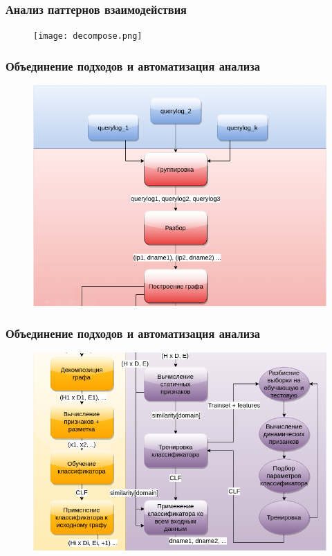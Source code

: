 \documentclass[12pt,pdf,hyperref={unicode}]{beamer}
\begin{document}
\begin{frame}
\frametitle{Анализ паттернов взаимодействия}
\begin{figure}[H]
	\centering
	\texttt{[image: decompose.png]}
\end{figure}
\end{frame}

\begin{frame}
\frametitle{Объединение подходов и автоматизация анализа}
\begin{figure}[H]
	\centering
	\includegraphics[scale=0.37]{schema-head.png}
\end{figure}
\end{frame}

\begin{frame}
\frametitle{Объединение подходов и автоматизация анализа}
\begin{figure}[H]
	\centering
	\includegraphics[scale=0.37]{schema-tail.png}
\end{figure}
\end{frame}
\end{document}
